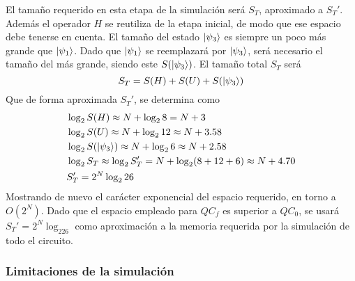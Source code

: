 El tamaño requerido en esta etapa de la simulación será $S_T$, aproximado a 
$S_T'$. Además el operador $H$ se reutiliza de la etapa inicial, de modo que ese 
espacio debe tenerse en cuenta. El tamaño del estado $\ket{\psi_{3}}$ es siempre un 
poco más grande que $\ket{\psi_{1}}$. Dado que $\ket{\psi_{1}}$ se reemplazará por $\ket{\psi_{3}}$, 
será necesario el tamaño del más grande, siendo este $S(\ket{\psi_{3}})$. El tamaño 
total $S_T$ será
$$ S_T = S(H) + S(U) + S(\ket{\psi_{3}})$$
Que de forma aproximada $S_T'$, se determina como
%
\begin{equation*}
\begin{split}
&\log_2 S(H) \approx N + \log_2 8 = N+3 \\
&\log_2 S(U) \approx N + \log_2 12 \approx N+3.58\\
&\log_2 S(\ket{\psi_{3}}) \approx N + \log_2 6 \approx N+2.58 \\
&\log_2 S_T \approx \log_2 S_T' = N+\log_2 (8 + 12 + 6) \approx N+4.70 \\
&S_T' = 2^N \log_226
\end{split}
\end{equation*}
%
Mostrando de nuevo el carácter exponencial del espacio requerido, en torno a 
$O(2^N)$. Dado que el espacio empleado para $QC_f$ es superior a $QC_0$, se 
usará $S_T' = 2^N \log_226$ como aproximación a la memoria requerida por la 
simulación de todo el circuito.

\subsubsection{Limitaciones de la simulación}

